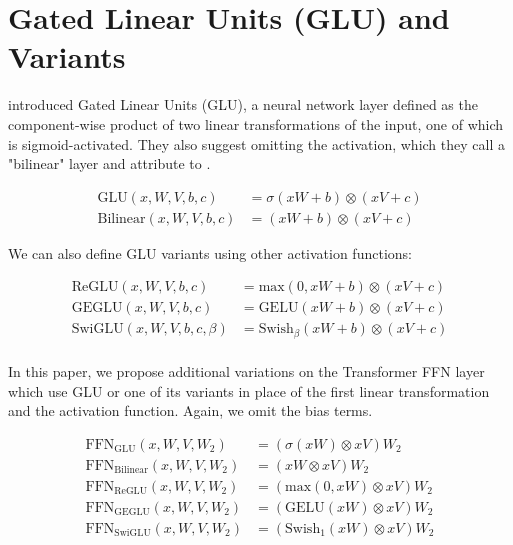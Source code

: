 \section{Gated Linear Units (GLU) and Variants}

\citep{dauphin2016} introduced Gated Linear Units (GLU), a neural network layer defined as the component-wise product of two linear transformations of the input, one of which is sigmoid-activated.  They also suggest omitting the activation, which they call a "bilinear" layer and attribute to \citep{mnih2007three}.

\begin{equation}
\begin{split}
\textrm{GLU}(x, W, V, b, c) & = \sigma(xW + b) \otimes (xV + c) \\
\textrm{Bilinear}(x, W, V, b, c) & = (xW + b) \otimes (xV + c)
\end{split}
\end{equation}

We can also define GLU variants using other activation functions:

\begin{equation}
\begin{split}
\textrm{ReGLU}(x, W, V, b, c) & = \textrm{max}(0, xW + b) \otimes (xV + c) \\
\textrm{GEGLU}(x, W, V, b, c) & = \textrm{GELU}(xW + b) \otimes (xV + c) \\
\textrm{SwiGLU}(x, W, V, b, c, \beta) & = \textrm{Swish}_\beta(xW + b) \otimes (xV + c) \\
\end{split}
\end{equation}

In this paper, we propose additional variations on the Transformer FFN layer which use GLU or one of its variants in place of the first linear transformation and the activation function.  Again, we omit the bias terms.

\begin{equation}
\begin{split}
\textrm{FFN}_\textrm{GLU}(x, W, V, W_2) & = (\sigma(xW) \otimes xV)W_2 \\
\textrm{FFN}_\textrm{Bilinear}(x, W, V, W_2) & = (xW \otimes xV)W_2 \\
\textrm{FFN}_\textrm{ReGLU}(x, W, V, W_2) & = (\textrm{max}(0, xW) \otimes xV)W_2 \\
\textrm{FFN}_\textrm{GEGLU}(x, W, V, W_2) & = (\textrm{GELU}(xW) \otimes xV)W_2 \\
\textrm{FFN}_\textrm{SwiGLU}(x, W, V, W_2) & = (\textrm{Swish}_1(xW) \otimes xV)W_2 \\
\end{split}
\end{equation}

